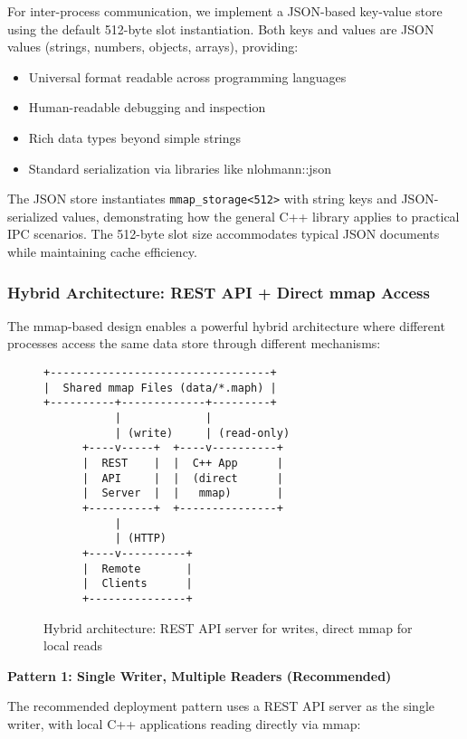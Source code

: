 \documentclass[10pt,conference]{IEEEtran}
\begin{document}
For inter-process communication, we implement a JSON-based key-value store using the default 512-byte slot instantiation. Both keys and values are JSON values (strings, numbers, objects, arrays), providing:
\begin{itemize}
\item Universal format readable across programming languages
\item Human-readable debugging and inspection
\item Rich data types beyond simple strings
\item Standard serialization via libraries like nlohmann::json
\end{itemize}

The JSON store instantiates \texttt{mmap\_storage<512>} with string keys and JSON-serialized values, demonstrating how the general C++ library applies to practical IPC scenarios. The 512-byte slot size accommodates typical JSON documents while maintaining cache efficiency.

\subsubsection{Hybrid Architecture: REST API + Direct mmap Access}

The mmap-based design enables a powerful hybrid architecture where different processes access the same data store through different mechanisms:

\begin{figure}[htbp]
\centering
\small
\begin{verbatim}
+----------------------------------+
|  Shared mmap Files (data/*.maph) |
+----------+-------------+---------+
           |             |
           | (write)     | (read-only)
      +----v-----+  +----v----------+
      |  REST    |  |  C++ App      |
      |  API     |  |  (direct      |
      |  Server  |  |   mmap)       |
      +----------+  +---------------+
           |
           | (HTTP)
      +----v----------+
      |  Remote       |
      |  Clients      |
      +---------------+
\end{verbatim}
\caption{Hybrid architecture: REST API server for writes, direct mmap for local reads}
\label{fig:hybrid-arch}
\end{figure}

\textbf{Pattern 1: Single Writer, Multiple Readers (Recommended)}

The recommended deployment pattern uses a REST API server as the single writer, with local C++ applications reading directly via mmap:
\end{document}
